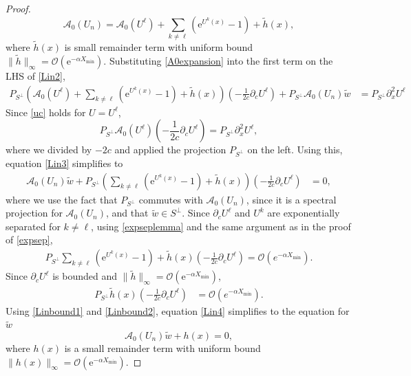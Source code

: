 \documentclass[review,onefignum,onetabnum]{siamart171218}
\newcommand{\rme}{\mathrm{e}}
\newcommand{\calA}{\mathcal{A}}
\begin{document}
\begin{proof}
\begin{equation}\label{A0expansion}
\calA_0(U_n) = \calA_0(U^\ell) + \sum_{k \neq \ell} (\rme^{U^k(x)} - 1) + \tilde{h}(x),
\end{equation}
where $\tilde{h}(x)$ is small remainder term with uniform bound $\|\tilde{h}\|_\infty = \mathcal{O}(\rme^{-\alpha X_{\mathrm{min}}})$. Substituting \cref{A0expansion} into the first term on the LHS of \cref{Lin2},
\begin{align}\label{Lin3}
P_{S^\perp} \left( \calA_0(U^\ell) + \sum_{k \neq \ell} (\rme^{U^k(x)} - 1) + \tilde{h}(x) \right) \left(-\frac{1}{2c}\partial_cU^\ell \right) + P_{S^\perp} \calA_0(U_n) \tilde{w} &= P_{S^\perp}\partial_x^2U^\ell
\end{align}
Since \cref{uc} holds for $U = U^\ell$,
\begin{equation}
P_{S^\perp} \calA_0(U^\ell) \left( -\frac{1}{2c} \partial_c U^\ell \right) = P_{S^\perp}\partial_x^2 U^\ell,
\end{equation}
where we divided by $-2c$ and applied the projection $P_{S^\perp}$ on the left. Using this, equation \cref{Lin3} simplifies to
\begin{align}\label{Lin4}
\calA_0(U_n) \tilde{w} +
P_{S^\perp} \left( \sum_{k \neq \ell} (\rme^{U^k(x)} - 1) + \tilde{h}(x) \right) \left(-\frac{1}{2c}\partial_cU^\ell \right) &= 0,
\end{align}
where we use the fact that $P_{S^\perp}$ commutes with $\calA_0(U_n)$, since it is a spectral projection for $\calA_0(U_n)$, and that $\tilde{w} \in S^\perp$. Since $\partial_c U^\ell$ and $U^k$ are exponentially separated for $k \neq \ell$, using \cref{expseplemma} and the same argument as in the proof of \cref{expsep},
\begin{align}\label{Linbound1}
P_{S^\perp} \sum_{k \neq \ell} (\rme^{U^k(x)} - 1) + \tilde{h}(x) \left(-\frac{1}{2c}\partial_cU^\ell \right) = \mathcal{O}\left(e^{-\alpha X_{\min}}\right).
\end{align}
Since $\partial_c U^\ell$ is bounded and  $\|\tilde{h}\|_\infty = \mathcal{O}(\rme^{-\alpha X_{\mathrm{min}}})$,
\begin{align}\label{Linbound2}
P_{S^\perp} \tilde{h}(x) \left(-\frac{1}{2c}\partial_cU^\ell \right) &=  \mathcal{O}\left(e^{-\alpha X_{\min}}\right).
\end{align}
Using \cref{Linbound1} and \cref{Linbound2}, equation \cref{Lin4} simplifies to the equation for $\tilde{w}$
\begin{equation}\label{A0heq}
\calA_0(U_n) \tilde{w} + h(x) = 0,
\end{equation}
where $h(x)$ is a small remainder term with uniform bound $\|h(x)\|_\infty = \mathcal{O}(\rme^{-\alpha X_{\mathrm{min}}})$.


\end{proof}
\end{document}
